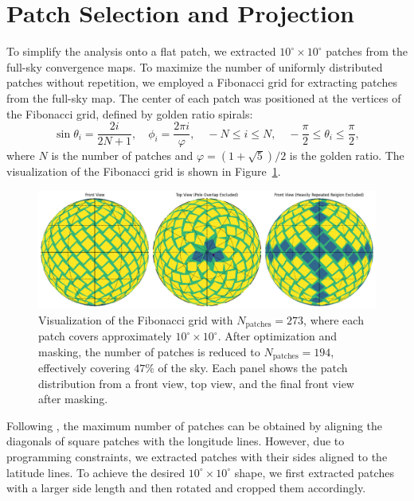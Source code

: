 \section{Patch Selection and Projection} \label{sec:patch_selection}
To simplify the analysis onto a flat patch, we extracted $10^\circ \times 10^\circ$ patches from the full-sky convergence maps. To maximize the number of uniformly distributed patches without repetition, we employed a Fibonacci grid \citep{2006QJRMS.132.1769S, 2023MNRAS.524.5591F} for extracting patches from the full-sky map. The center of each patch was positioned at the vertices of the Fibonacci grid, defined by golden ratio spirals:
\begin{equation}
    \sin \theta_i = \frac{2i}{2N + 1}, \quad \phi_i = \frac{2 \pi i}{\varphi}, \quad -N \leq i \leq N, \quad -\frac{\pi}{2} \leq \theta_i \leq \frac{\pi}{2},
\end{equation}
where $N$ is the number of patches and $\varphi = (1 + \sqrt{5})/2$ is the golden ratio. The visualization of the Fibonacci grid is shown in Figure~\ref{fig:fibonacci}.
\begin{figure}[ht]
    \centering
    \includegraphics[width=\textwidth]{figures/fibonacci_grid.png}
    \caption[Visualization of the Fibonacci grid]{Visualization of the Fibonacci grid with $N_{\text{patches}} = 273$, where each patch covers approximately $10^\circ \times 10^\circ$. After optimization and masking, the number of patches is reduced to $N_{\text{patches}} = 194$, effectively covering $47\%$ of the sky. Each panel shows the patch distribution from a front view, top view, and the final front view after masking.}
    \label{fig:fibonacci}
\end{figure}
Following \citet{2023MNRAS.524.5591F}, the maximum number of patches can be obtained by aligning the diagonals of square patches with the longitude lines. However, due to programming constraints, we extracted patches with their sides aligned to the latitude lines. To achieve the desired $10^\circ \times 10^\circ$ shape, we first extracted patches with a larger side length and then rotated and cropped them accordingly.

